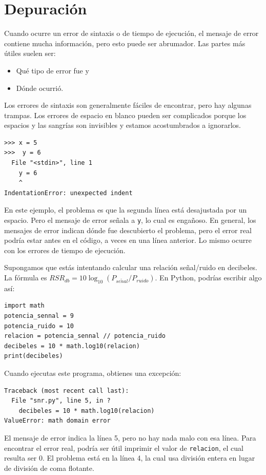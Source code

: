 \documentclass[10pt]{book}
\begin{document}
\section{Depuración}
\label{whitespace}

Cuando ocurre un error de sintaxis o de tiempo de ejecución, el mensaje de error contiene
mucha información, pero esto puede ser abrumador.  Las partes
más útiles suelen ser:

\begin{itemize}

\item Qué tipo de error fue y

\item Dónde ocurrió.

\end{itemize}

Los errores de sintaxis son generalmente fáciles de encontrar, pero hay algunas
trampas.  Los errores de espacio en blanco pueden ser complicados porque los espacios y
las sangrías son invisibles y estamos acostumbrados a ignorarlos.

\begin{verbatim}
>>> x = 5
>>>  y = 6
  File "<stdin>", line 1
    y = 6
    ^
IndentationError: unexpected indent
\end{verbatim}
%
En este ejemplo, el problema es que la segunda línea está desajustada por
un espacio.  Pero el mensaje de error señala a {\tt y}, lo cual es
engañoso.  En general, los mensajes de error indican dónde fue descubierto
el problema, pero el error real podría estar antes en el código,
a veces en una línea anterior. Lo mismo ocurre con los errores de tiempo de ejecución. 

Supongamos que estás intentando
calcular una relación señal/ruido en decibeles.  La fórmula
es $RSR_{db} = 10 \log_{10} (P_{se\tilde{n}al} / P_{ruido})$.  En Python,
podrías escribir algo así:

\begin{verbatim}
import math
potencia_sennal = 9
potencia_ruido = 10
relacion = potencia_sennal // potencia_ruido
decibeles = 10 * math.log10(relacion)
print(decibeles)
\end{verbatim}
%
Cuando ejecutas este programa, obtienes una excepción:
%

\begin{verbatim}
Traceback (most recent call last):
  File "snr.py", line 5, in ?
    decibeles = 10 * math.log10(relacion)
ValueError: math domain error
\end{verbatim}
%
El mensaje de error indica la línea 5, pero no hay nada
malo con esa línea.  Para encontrar el error real, podría ser
útil imprimir el valor de {\tt relacion}, el cual resulta
ser 0.  El problema está en la línea 4, la cual usa división entera
en lugar de división de coma flotante.
\end{document}
